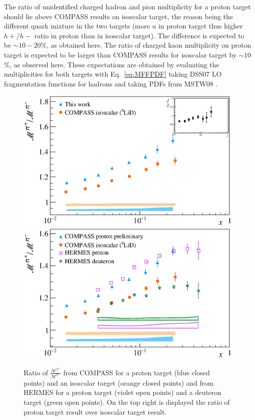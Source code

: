 The ratio of unidentified charged hadron and pion multiplicity for a proton target should lie above COMPASS results on isoscalar target, the reason being the different quark mixture in the two targets (more $u$ in proton target thus higher $h+$/$h-$ ratio in proton than in isoscalar target). The difference is expected to be $\sim$$10-20$\%, as obtained here. The ratio of charged kaon multiplicity on proton target is expected to be larger than COMPASS results for isoscalar target by $\sim$$10$\%, as observed here. These expectations are obtained by evaluating the multiplicities for both targets with Eq.~\ref{eq:MFFPDF} taking DSS07 \cite{DSS07} LO fragmentation functions for hadrons and taking PDFs from MSTW08 \cite{MSTW08}.

\begin{figure}[!h]
  \centering
	\includegraphics[scale=0.5]{./gfx/Mult_pi_ratio_noH.eps}
	\includegraphics[scale=0.5]{./gfx/Mult_pi_ratio.eps}
	\caption{Ratio of $\frac{\mathscr{M}^{\pi^+}}{\mathscr{M}^{\pi^-}}$ from COMPASS for a proton target (blue closed points) and an isoscalar target (orange closed points) and from HERMES for a proton target (violet open points) and a deuteron target (green open points). On the top right is displayed the ratio of proton target result over isoscalar target result.}
	\label{pic:piratio}
\end{figure}

